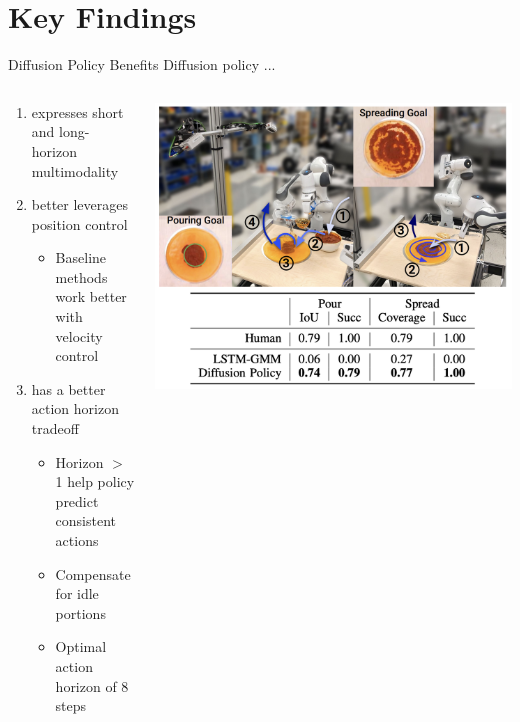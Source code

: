 \documentclass{beamer}
\begin{document}
\section{Key Findings}
\begin{frame}[t]{Diffusion Policy Benefits}
    Diffusion policy ...
	\begin{columns}
		\begin{column}{.5\textwidth}
    \begin{enumerate}[label=\arabic*.]
        \item expresses short and long-horizon multimodality
        \item better leverages position control
        \begin{itemize}[label=-]
            \item Baseline methods work better with velocity control
        \end{itemize}
        \item has a better action horizon tradeoff
        \begin{itemize}[label=-]
            \item Horizon $>$ 1 help policy predict consistent actions 
            \item Compensate for idle portions
            \item Optimal action horizon of 8 steps
        \end{itemize}
    \end{enumerate}
		\end{column}
		\begin{column}{.5\textwidth}
            \begin{center}
                \includegraphics[width=\textwidth]{./img/real_world_diff.png}
            \end{center}
		\end{column}
	\end{columns}
\end{frame}
\end{document}
